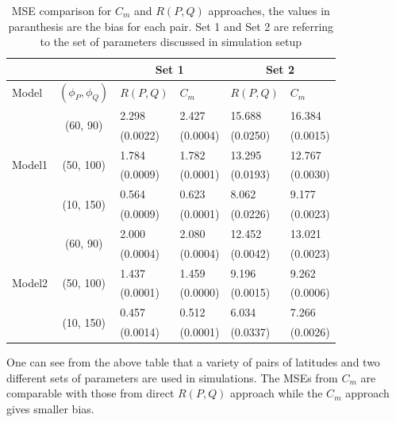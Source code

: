 \begin{table}[H]
\label{parameters}
\centering
\caption[MSE Comparison For $C_m$ and $R(P,Q)$ Approaches, The Values in Paranthesis]{MSE comparison for $C_m$ and $R(P,Q)$ approaches, the values in paranthesis are the bias for each pair.  Set 1 and Set 2 are referring to the set of parameters discussed in simulation setup}
\vskip 16pt
\begin{tabular}{|l|c|l|l|l|l|}
\hline
\multicolumn{2}{|c|}{}      & \multicolumn{2}{|c|}{Set 1} & \multicolumn{2}{|c|}{Set 2}  \\ \hline
Model & $(\phi_P, \phi_Q)$  & $R(P,Q)$  & $C_m$           & $R(P,Q)$  & $C_m$  \\ \hline
\multirow{6}{*}{Model1} & \multirow{2}{*}{(60, 90)}  & 2.298    & 2.427	  & 15.688	& 16.384	 \\
                        & &                            (0.0022) & (0.0004)& (0.0250)& (0.0015)	\\ \cline{2-6}
                        & \multirow{2}{*}{(50, 100)} & 1.784    & 1.782	  & 13.295 	& 12.767 	 \\
                        & &                            (0.0009) &(0.0001) & (0.0193)& (0.0030) 	 \\ \cline{2-6}
                        & \multirow{2}{*}{(10, 150)} & 0.564    & 0.623	  & 8.062	  & 9.177	 \\ 
                        & &                            (0.0009) &(0.0001) & (0.0226)& (0.0023)	 \\ \hline
\multirow{6}{*}{Model2} & \multirow{2}{*}{(60, 90)}  & 2.000    & 2.080	  & 12.452	& 13.021	 \\
                        & &                            (0.0004) & (0.0004)& (0.0042) & (0.0023)	\\ \cline{2-6}
                        & \multirow{2}{*}{(50, 100)} & 1.437    & 1.459	  & 9.196	  & 9.262 	 \\
                        & &                            (0.0001) &(0.0000) & (0.0015)& (0.0006) 	 \\ \cline{2-6}
                        & \multirow{2}{*}{(10, 150)} & 0.457    & 0.512	  & 6.034	  & 7.266	 \\ 
                        & &                            (0.0014) &(0.0001) & (0.0337)& (0.0026)	 \\ \hline
\end{tabular}
\end{table}

One can see from the above table that a variety of pairs of latitudes and two different sets of parameters are used in simulations. The MSEs from $C_m$ are comparable with those from direct $R(P,Q)$ approach while the $C_m$ approach gives smaller bias.



